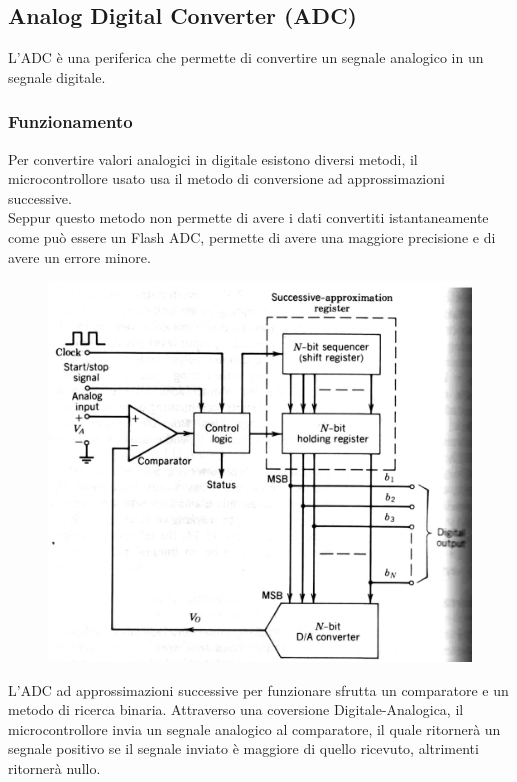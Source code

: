 \pagebreak
\subsection{Analog Digital Converter (ADC)}
L'ADC è una periferica che permette di convertire un segnale analogico in un segnale digitale. 

\subsubsection{Funzionamento}
Per convertire valori analogici in digitale esistono diversi metodi, il microcontrollore usato usa il metodo di conversione ad approssimazioni successive.\\

Seppur questo metodo non permette di avere i dati convertiti istantaneamente come può essere un Flash ADC, permette di avere una maggiore precisione e di avere un errore minore.\\

\begin{figure}
    \includegraphics[width=0.8\linewidth]{microcontrollore/assets/ADC.png}
    \label{fig:ADC}
\end{figure}

L'ADC ad approssimazioni successive per funzionare sfrutta un comparatore e un metodo di ricerca binaria. Attraverso una coversione Digitale-Analogica, il microcontrollore invia un segnale analogico al comparatore, il quale ritornerà un segnale positivo se il segnale inviato è maggiore di quello ricevuto, altrimenti ritornerà nullo.\\

